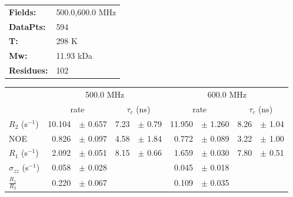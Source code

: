 \documentclass[showkeys,aps,prb,prepreint,amssymb, amsmath,nobibnotes]{article}
\begin{document}
\begin{tabular}{ll}
\textbf{Fields:} &  500.0,600.0 MHz\\
\textbf{DataPts:} &  594\\
 \textbf{T:} & 298 K\\
\textbf{Mw:} & 11.93 kDa\\
\textbf{Residues: } &   102\\
\end{tabular}

\begin{small}
\noindent \begin{tabular}{l|rlrl|rlrl}
& \multicolumn{4}{c}{500.0 MHz}& \multicolumn{4}{c}{600.0 MHz}\\
&  \multicolumn{2}{c}{rate} & \multicolumn{2}{c}{$\tau_c$ (ns)}   &  \multicolumn{2}{c}{rate} & \multicolumn{2}{c}{$\tau_c$ (ns)}   \\
\hline$R_2$  (s$^{-1}$)  &  10.104 & $\pm$ 0.657   &  7.23 & $\pm$ 0.79 &  11.950 & $\pm$ 1.260   &  8.26 & $\pm$ 1.04 \\
NOE  &  0.826 & $\pm$ 0.097   &  4.58 & $\pm$ 1.84 &  0.772 & $\pm$ 0.089   &  3.22 & $\pm$ 1.00 \\
$R_1$ (s$^{-1}$)  &  2.092 & $\pm$ 0.051   &  8.15 & $\pm$ 0.66 &  1.659 & $\pm$ 0.030   &  7.80 & $\pm$ 0.51 \\
$\sigma_{zz}$  (s$^{-1}$)  &  0.058 & $\pm$ 0.028   & & &  0.045 & $\pm$ 0.018   & & \\
$\frac{R_1}{R_2}$  &  0.220 & $\pm$ 0.067   & & &  0.109 & $\pm$ 0.035   & & \\
\end{tabular}
\end{small}
\end{document}
